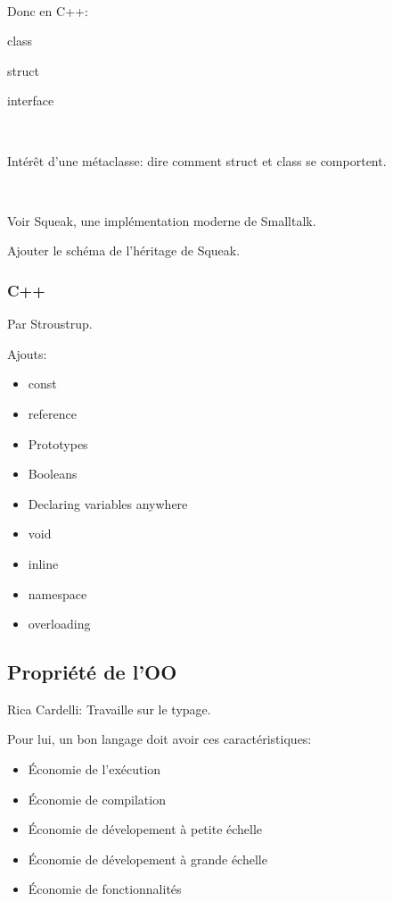 \documentclass[a4paper,11pt]{article}
\begin{document}
\

Donc en C++:

class

struct

interface

\

Intérêt d'une métaclasse: dire comment struct et class se comportent.

\

Voir Squeak, une implémentation moderne de Smalltalk.

Ajouter le schéma de l'héritage de Squeak.

\subsubsection{C++}

Par Stroustrup.

Ajouts:

\begin{itemize}

\item const

\item reference

\item Prototypes

\item Booleans

\item Declaring variables anywhere

\item void

\item inline

\item namespace

\item overloading

\end{itemize}

\subsection{Propriété de l'OO}

Rica Cardelli: Travaille sur le typage.

Pour lui, un bon langage doit avoir ces caractéristiques:

\begin{itemize}

\item Économie de l'exécution

\item Économie de compilation

\item Économie de dévelopement à petite échelle

\item Économie de dévelopement à grande échelle

\item Économie de fonctionnalités

\end{itemize}
\end{document}
